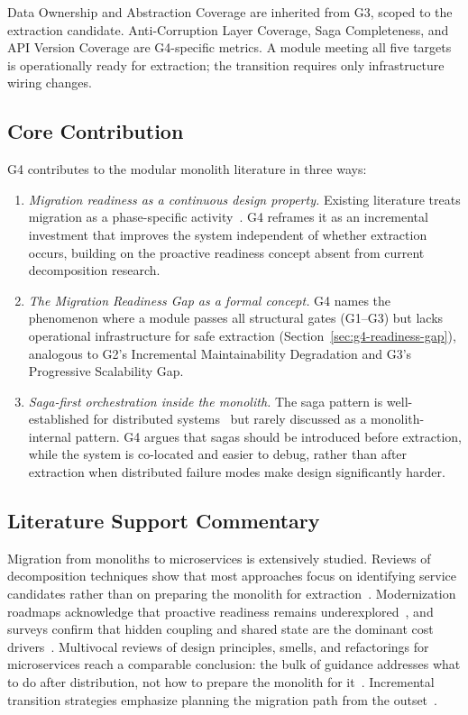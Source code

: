 \medskip
\noindent
Data Ownership and Abstraction Coverage are inherited from G3, scoped to the extraction candidate. Anti-Corruption Layer Coverage, Saga Completeness, and API Version Coverage are G4-specific metrics. A module meeting all five targets is operationally ready for extraction; the transition requires only infrastructure wiring changes.

\subsection*{Core Contribution}

G4 contributes to the modular monolith literature in three ways:

\begin{enumerate}[itemsep=8pt,topsep=2pt]
  \item \emph{Migration readiness as a continuous design property.} Existing literature treats migration as a phase-specific activity~\cite{wolfart2021modernizing, abgaz2023decomposition}. G4 reframes it as an incremental investment that improves the system independent of whether extraction occurs, building on the proactive readiness concept absent from current decomposition research.

  \item \emph{The Migration Readiness Gap as a formal concept.} G4 names the phenomenon where a module passes all structural gates (G1--G3) but lacks operational infrastructure for safe extraction (Section~\ref{sec:g4-readiness-gap}), analogous to G2's Incremental Maintainability Degradation and G3's Progressive Scalability Gap.

  \item \emph{Saga-first orchestration inside the monolith.} The saga pattern is well-established for distributed systems~\cite{richardson2018microservices} but rarely discussed as a monolith-internal pattern. G4 argues that sagas should be introduced before extraction, while the system is co-located and easier to debug, rather than after extraction when distributed failure modes make design significantly harder.
\end{enumerate}

\subsection*{Literature Support Commentary}

Migration from monoliths to microservices is extensively studied. Reviews of decomposition techniques show that most approaches focus on identifying service candidates rather than on preparing the monolith for extraction~\cite{abgaz2023decomposition}. Modernization roadmaps acknowledge that proactive readiness remains underexplored~\cite{wolfart2021modernizing}, and surveys confirm that hidden coupling and shared state are the dominant cost drivers~\cite{fritzsch2019, salii2023migrating}. Multivocal reviews of design principles, smells, and refactorings for microservices reach a comparable conclusion: the bulk of guidance addresses what to do after distribution, not how to prepare the monolith for it~\cite{neri2020multivocal}. Incremental transition strategies emphasize planning the migration path from the outset~\cite{bozan2020transition}.

